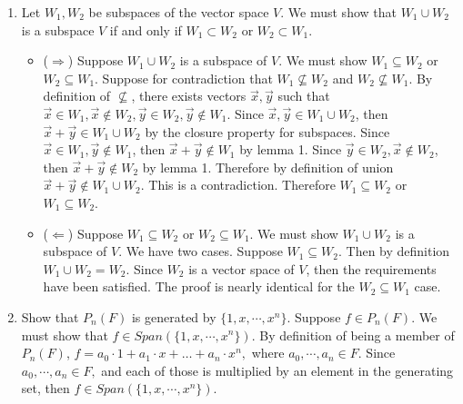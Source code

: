 \documentclass[12pt, letterpaper]{article}
\begin{document}
\begin{enumerate}
		
		\item Let $W_1, W_2$ be subspaces of the vector space $V$.  We must show that $W_1 \cup W_2$ is a subspace $V$ if and only if $W_1 \subset W_2$ or $W_2 \subset W_1$.
		\begin{itemize}
			\item ($\Rightarrow$)  Suppose $W_1 \cup W_2$ is a subspace of $V$.  We must show  $W_1 \subseteq W_2$ or $W_2 \subseteq W_1$.  Suppose for contradiction that $W_1 \nsubseteq W_2$ and $W_2 \nsubseteq W_1$.  By definition of $\nsubseteq$, there exists vectors $\Vec{x}, \Vec{y}$ such that $\Vec{x} \in W_1, \Vec{x} \not \in W_2,\Vec{y} \in W_2, \Vec{y} \not \in W_1$.  Since $\Vec{x},\Vec{y} \in W_1 \cup W_2$, then $\Vec{x} + \Vec{y} \in W_1 \cup W_2$ by the closure property for subspaces. Since $\Vec{x} \in W_1, \Vec{y} \not \in W_1$, then $\Vec{x} + \Vec{y} \not \in W_1$   by lemma 1.  Since $\Vec{y} \in W_2, \Vec{x} \not \in W_2$, then $\Vec{x} + \Vec{y} \not \in W_2$ by lemma 1.  Therefore by definition of union $\Vec{x} + \Vec{y} \not \in W_1 \cup W_2$.  This is a contradiction.  Therefore $W_1 \subseteq W_2$ or $W_1 \subseteq W_2$.  
			\item ($\Leftarrow$)  Suppose $W_1 \subseteq W_2$ or $W_2 \subseteq W_1$.  We must show $W_1 \cup W_2$ is a subspace of $V$.  We have two cases.  Suppose  $W_1 \subseteq W_2$.  Then by definition $W_1 \cup W_2 = W_2$.  Since $W_2$ is a vector space of $V$, then the requirements have been satisfied.  The proof is nearly identical for the $W_2 \subseteq W_1$ case.  
		\end{itemize}
		\newpage		  
		\item Show that $P_n(F)$ is generated by $\{1,x,\cdots, x^n\}$.  Suppose $f \in P_n(F)$.  We must show that $f \in Span(\{1,x,\cdots, x^n\})$.  By definition of being a member of $P_n(F)$, $f = a_0 \cdot 1 + a_1 \cdot x + \ldots + a_n \cdot x^n,$ where $a_0,\cdots,a_n \in F$.  Since $a_0, \cdots, a_n \in F,$ and each of those is multiplied by an element in the generating set, then $f \in Span(\{1,x,\cdots, x^n\})$.
		\newpage    





\end{enumerate}
\end{document}
